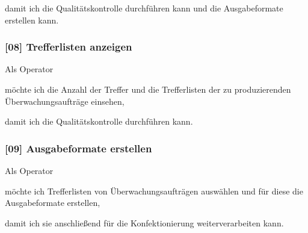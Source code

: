 damit ich die Qualitätskontrolle durchführen kann und die Ausgabeformate erstellen kann.

\subsubsection{[08] Trefferlisten anzeigen}

Als Operator

möchte ich die Anzahl der Treffer und die Trefferlisten der zu produzierenden
Überwachungsaufträge einsehen,

damit ich die Qualitätskontrolle durchführen kann.

\subsubsection{[09] Ausgabeformate erstellen}

Als Operator

möchte ich Trefferlisten von Überwachungsaufträgen auswählen und für diese die
Ausgabeformate erstellen,

damit ich sie anschließend für die Konfektionierung weiterverarbeiten kann.
